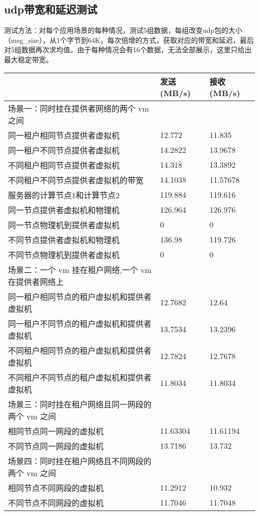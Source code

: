 \documentclass[a4paper,left=1.5cm,right=1.5cm,11pt]{article}
\begin{document}
\subsection{udp带宽和延迟测试}
测试方法：对每个应用场景的每种情况，测试5组数据，每组改变udp包的大小（msg\_size），从1个字节到64K，每次倍增的方式，获取对应的带宽和延迟，最后对5组数据再次求均值。由于每种情况会有16个数据，无法全部展示，这里只给出最大稳定带宽。
\begin{center}
\begin{tabular}[c]{|l|l|l|}
\hline
 &发送(MB/s) &接收(MB/s)\\
\hline
 场景一：同时挂在提供者网络的两个 vm 之间 &  & \\
\hline
 同一租户相同节点提供者虚拟机 & 12.772&11.835  \\
\hline
 同一租户不同节点提供者虚拟机 & 14.2822&13.9678  \\
 \hline
 不同租户相同节点提供者虚拟机& 14.318&13.3892  \\
 \hline
 不同租户不同节点提供者虚拟机的带宽&14.1038 &11.57678 \\
 \hline
 服务器的计算节点1和计算节点2&119.884 &119.616  \\
 \hline
 同一节点提供者虚拟机和物理机&126.964 &126.976  \\
 \hline
 同一节点物理机到提供者虚拟机&0 &0  \\
 \hline
 不同节点提供者虚拟机和物理机&136.98 &119.726  \\
 \hline
 不同节点物理机到提供者虚拟机&0 &0  \\
 \hline
 \hline
 场景二：一个 vm 挂在租户网络,一个 vm 在提供者网络上& & \\
 \hline
 同一租户相同节点的租户虚拟机和提供者虚拟机&12.7682 &12.64  \\
 \hline
 同一租户不同节点的租户虚拟机和提供者虚拟机&13.7534 &13.2396 \\
 \hline
 不同租户相同节点的租户虚拟机和提供者虚拟机&12.7824 &12.7678  \\
 \hline
 不同租户不同节点的租户虚拟机和提供者虚拟机&11.8034 &11.8034  \\
 \hline
 \hline
 场景三：同时挂在租户网络且同一网段的两个 vm 之间& & \\
 \hline
 相同节点同一网段的虚拟机& 11.63304 &11.61194 \\
 \hline
 不同节点同一网段的虚拟机&  13.7186 &13.732 \\
 \hline
 \hline
 场景四：同时挂在租户网络且不同网段的两个 vm 之间& &\\
 \hline
 相同节点不同网段的虚拟机&11.2912  &10.932 \\
 \hline
 不同节点不同网段的虚拟机&11.7046  &11.7048 \\

\hline
\end{tabular}
\end{center}
\end{document}
